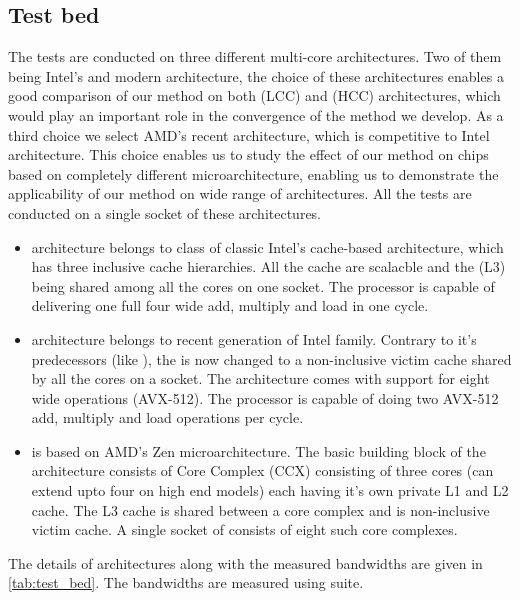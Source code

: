 \subsection{Test bed}
The tests are conducted on three different multi-core architectures. Two of them being Intel's \IVB and modern \SKX architecture, the choice of these architectures enables a good comparison of our method on both \LCCfull (LCC) and \HCCfull (HCC) architectures, which would play an important role in the convergence of the method we develop. As a third choice we select AMD's recent \EPY architecture, which is competitive to Intel \SKX architecture. This choice enables us to study the effect of our method on chips based on completely different microarchitecture, enabling us to demonstrate the applicability of our method on wide range of architectures. All the tests are conducted on a single socket of these architectures. 

\begin{itemize}
	\item \Intel \IVB architecture belongs to class of classic Intel's cache-based architecture, which has three inclusive cache  hierarchies. All the cache are scalacble and the \LLC (L3) being shared among all the cores on one socket. The processor is capable of delivering one full four wide \SIMD add, multiply and load in one cycle. 
	\item \Intel \SKX architecture belongs to recent generation of Intel family. Contrary to it's predecessors (like \IVB), the \LLC is now changed to a non-inclusive victim cache shared by all the cores on a socket. The architecture comes with support for eight wide \SIMD operations (AVX-512). The processor is capable of doing two AVX-512 add, multiply and load operations per cycle.
	\item \AMD \EPY is based on AMD's Zen microarchitecture. The basic building block of the architecture consists of Core Complex (CCX) consisting of three cores (can extend upto four on high end models) each having it's own private L1 and L2 cache. The L3 cache is shared between a core complex and is non-inclusive victim cache. A single socket of \EPY consists of eight such core complexes.
	
\end{itemize}
The details of architectures along with the measured bandwidths are given in \cref{tab:test_bed}. The bandwidths are measured using \likwidBench suite.

